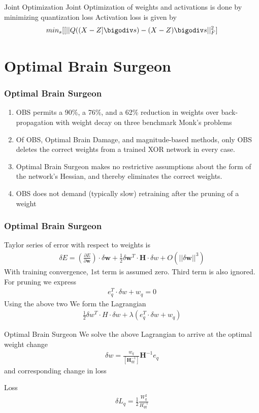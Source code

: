\documentclass{beamer}
\theoremstyle{plain}
\theoremstyle{definition}
\theoremstyle{remark}
\numberwithin{equation}{section}
\numberwithin{figure}{section}
\numberwithin{theorem}{section}
\begin{document}
\begin{frame}{Joint Optimization}
Joint Optimization of weights and activations is done by minimizing quantization loss
Activation loss is given by
\begin{align}
    min_s[[||Q((X-Z]\bigodiv s) - (X-Z) \bigodiv s||^2_F]
\end{align}  
\end{frame}
\section{Optimal Brain Surgeon}
\begin{frame}
\frametitle{Optimal Brain Surgeon}
\begin{enumerate}
    \item OBS permits a 90\%, a 76\%, and a 62\% reduction in weights over back-propagation with weight decay on three benchmark Monk's problems 
    \item Of OBS, Optimal Brain Damage, and magnitude-based methods, only OBS deletes the correct weights from a trained XOR network in every case. 
    \item Optimal Brain Surgeon makes no restrictive assumptions about the form of the network's Hessian, and thereby eliminates the correct weights. 
    \item OBS does not demand (typically slow) retraining after the pruning of a weight
\end{enumerate}
\end{frame}
\begin{frame}[shrink]
\frametitle{Optimal Brain Surgeon}
Taylor series of error with respect to weights is 
\begin{align}
    \delta E = \left(\frac{\partial E }{\partial \mathbf{w}}\right) \cdot \delta\mathbf{w} + \frac{1}{2} \delta \mathbf{w}^T \cdot \mathbf{H} \cdot \delta w + O(|| \delta \mathbf{w} ||^3)
\end{align}
With training convergence, 1st term is assumed zero. Third term is also ignored.
For pruning we express
\begin{align}
    e^T_q \cdot \delta w  + w_q = 0
\end{align}
Using the above two We form the Lagrangian
\begin{align}
\frac{1}{2} \delta w^T \cdot H \cdot \delta w + \lambda (e^T_q \cdot \delta w + w_q)
\end{align}

\end{frame}
\begin{frame}{Optimal Brain Surgeon}
We solve the above Lagrangian to arrive at the optimal weight change
\begin{align}
    \delta w = \frac{w_q}{[\mathbf{H}^{-1}_{qq}]}\mathbf{H}^{-1} e_q
\end{align}
and corresponding change in loss
\begin{definition}Loss
\begin{align}
	\delta L_q = \frac{1}{2} \frac{W_q^2}{H^{-1}_{qq}}
\end{align}

\end{definition}
\end{frame}
\end{document}
